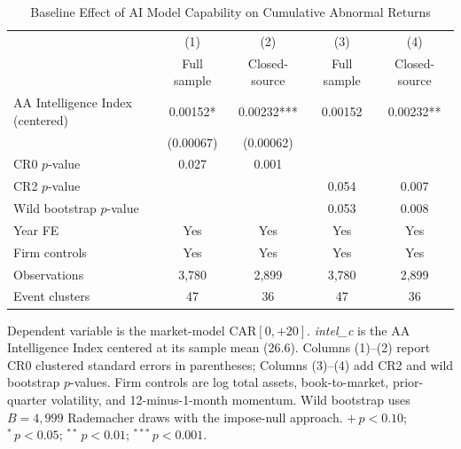 \documentclass[12pt]{article}
\begin{document}
\begin{table}[htbp]
\centering
\caption{Baseline Effect of AI Model Capability on Cumulative Abnormal Returns}
\label{tab:baseline}
\begin{threeparttable}
\begin{tabular}{lcccc}
\toprule
 & (1) & (2) & (3) & (4) \\
 & Full sample & Closed-source & Full sample & Closed-source \\
\midrule
AA Intelligence Index (centered) & 0.00152* & 0.00232*** & 0.00152 & 0.00232** \\
 & (0.00067) & (0.00062) & & \\[4pt]
CR0 $p$-value & 0.027 & 0.001 & & \\
CR2 $p$-value & & & 0.054 & 0.007 \\
Wild bootstrap $p$-value & & & 0.053 & 0.008 \\[6pt]
\midrule
Year FE & Yes & Yes & Yes & Yes \\
Firm controls & Yes & Yes & Yes & Yes \\
Observations & 3,780 & 2,899 & 3,780 & 2,899 \\
Event clusters & 47 & 36 & 47 & 36 \\
\bottomrule
\end{tabular}
\begin{tablenotes}[flushleft]\footnotesize
\item Dependent variable is the market-model CAR$[0,{+}20]$.
\textit{intel\_c} is the AA Intelligence Index centered at its sample mean (26.6).
Columns (1)--(2) report CR0 clustered standard errors in parentheses;
Columns (3)--(4) add CR2 and wild bootstrap $p$-values.
Firm controls are log total assets, book-to-market, prior-quarter volatility, and
12-minus-1-month momentum.
Wild bootstrap uses $B = 4{,}999$ Rademacher draws with the impose-null approach.
$+\,p<0.10$; $^{*}\,p<0.05$; $^{**}\,p<0.01$; $^{***}\,p<0.001$.
\end{tablenotes}
\end{threeparttable}
\end{table}
\end{document}
